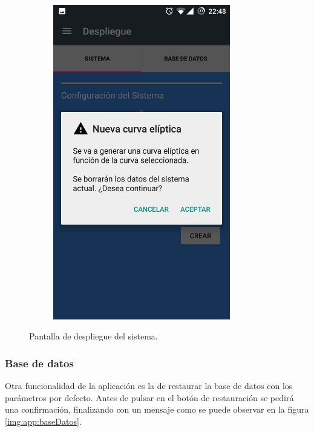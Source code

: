 \documentclass[../PFC.tex]{subfiles}
\begin{document}
\begin{figure}[H]
\begin{subfigure}{0.4\textwidth}
       \includegraphics[width=0.85\textwidth]{./img/app/despligueSistemaDialog}
    \end{subfigure}   
  \caption{Pantalla de despliegue del sistema.}
  \label{img:app:sistema}
\end{figure}

\subsubsection*{Base de datos}
\label{App:AD:D:Base de dtaos}

Otra funcionalidad de la aplicación es la de restaurar la base de datos con los parámetros por defecto. Antes de pulsar en el botón de restauración se pedirá una confirmación, finalizando con un mensaje como se puede observar en la figura \ref{img:app:baseDatos}.
\end{document}
